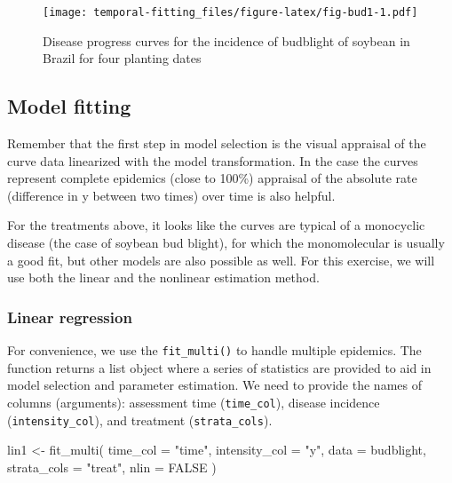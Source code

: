 \documentclass[
  letterpaper,
]{book}
\newenvironment{Shaded}{\begin{snugshade}}{\end{snugshade}}
\newcommand{\AttributeTok}[1]{\textcolor[rgb]{0.40,0.45,0.13}{#1}}
\newcommand{\ConstantTok}[1]{\textcolor[rgb]{0.56,0.35,0.01}{#1}}
\newcommand{\FunctionTok}[1]{\textcolor[rgb]{0.28,0.35,0.67}{#1}}
\newcommand{\NormalTok}[1]{\textcolor[rgb]{0.00,0.23,0.31}{#1}}
\newcommand{\OtherTok}[1]{\textcolor[rgb]{0.00,0.23,0.31}{#1}}
\newcommand{\StringTok}[1]{\textcolor[rgb]{0.13,0.47,0.30}{#1}}
\begin{document}
\begin{figure}

\texttt{[image: temporal-fitting\_files/figure-latex/fig-bud1-1.pdf]} \hfill{}

\caption{\label{fig-bud1}Disease progress curves for the incidence of
budblight of soybean in Brazil for four planting dates}

\end{figure}

\hypertarget{model-fitting-1}{%
\subsection{Model fitting}\label{model-fitting-1}}

Remember that the first step in model selection is the visual appraisal
of the curve data linearized with the model transformation. In the case
the curves represent complete epidemics (close to 100\%) appraisal of
the absolute rate (difference in y between two times) over time is also
helpful.

For the treatments above, it looks like the curves are typical of a
monocyclic disease (the case of soybean bud blight), for which the
monomolecular is usually a good fit, but other models are also possible
as well. For this exercise, we will use both the linear and the
nonlinear estimation method.

\hypertarget{linear-regression}{%
\subsubsection{Linear regression}\label{linear-regression}}

For convenience, we use the \texttt{fit\_multi()} to handle multiple
epidemics. The function returns a list object where a series of
statistics are provided to aid in model selection and parameter
estimation. We need to provide the names of columns (arguments):
assessment time (\texttt{time\_col}), disease incidence
(\texttt{intensity\_col}), and treatment (\texttt{strata\_cols}).

\begin{Shaded}
\begin{Highlighting}[]
\NormalTok{lin1 }\OtherTok{\textless{}{-}} \FunctionTok{fit\_multi}\NormalTok{(}
  \AttributeTok{time\_col =} \StringTok{"time"}\NormalTok{,}
  \AttributeTok{intensity\_col =} \StringTok{"y"}\NormalTok{,}
  \AttributeTok{data =}\NormalTok{ budblight,}
  \AttributeTok{strata\_cols =} \StringTok{"treat"}\NormalTok{,}
  \AttributeTok{nlin =} \ConstantTok{FALSE}
\NormalTok{)}
\end{Highlighting}
\end{Shaded}
\end{document}
